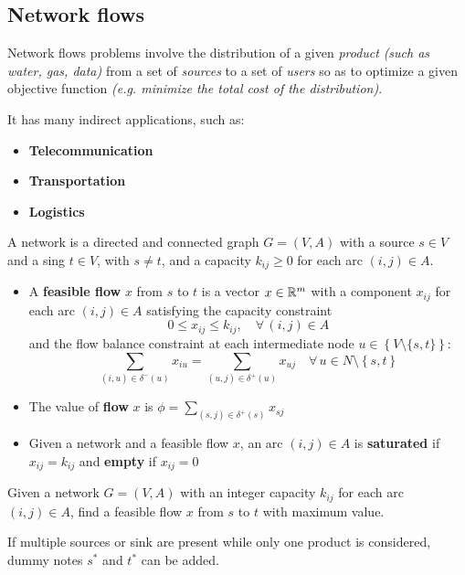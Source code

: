 \documentclass[english]{article}
\begin{document}
\subsection{Network flows}

Network flows problems involve the distribution of a given \textit{product} \textit{(such as water, gas, data)} from a set of \textit{sources} to a set of \textit{users} so as to optimize a given objective function \textit{(e.g. minimize the total cost of the distribution)}.

It has many indirect applications, such as:

\begin{itemize}
  \item \textbf{Telecommunication}
  \item \textbf{Transportation}
  \item \textbf{Logistics}
\end{itemize}

\begin{definition}
  A network is a directed and connected graph \(G = (V, A)\) with a source \(s \in V\) and a sing \(t \in V\), with \(s \neq t\), and a capacity \(k_{ij} \geq 0\) for each arc \((i, j) \in A\).
\end{definition}

\begin{itemize}
  \item A \textbf{feasible flow} \(x\) from \(s\) to \(t\) is a vector \(x \in \mathbb{R}^m\) with a component \(x_{ij}\) for each arc \((i, j) \in A\) satisfying the capacity constraint \[0 \leq x_{ij} \leq k_{ij}, \quad \forall \, \left( i, j \right) \in A\]
        and the flow balance constraint at each intermediate node \(u \in \left\{ V \setminus \{s, t\} \right\}\):
        \[\displaystyle \sum_{\left( i, u \right) \in \delta^{-}(u)} x_{iu} = \displaystyle \sum_{\left( u, j \right) \in \delta^{+}(u)} x_{uj} \quad \forall \, u \in N \setminus \left\{ s, t \right\} \]
  \item The value of \textbf{flow} \(x\) is \(\phi = \displaystyle \sum_{\left( s, j \right) \in \delta^{+}(s)} x_{sj}\)
  \item Given a network and a feasible flow \(x\), an arc \(\left( i, j \right) \in A\) is \textbf{saturated} if \(x_{ij} = k_{ij}\) and \textbf{empty} if \(x_{ij} = 0\)
\end{itemize}

\begin{definition}
  Given a network \(G = \left( V, A \right)\) with an integer capacity \(k_{ij}\) for each arc \((i, j) \in A\), find a feasible flow \(x\) from \(s\) to \(t\) with maximum value.

  If multiple sources or sink are present while only one product is considered, dummy notes \(s^\ast\) and \(t^\ast\) can be added.
\end{definition}
\end{document}
